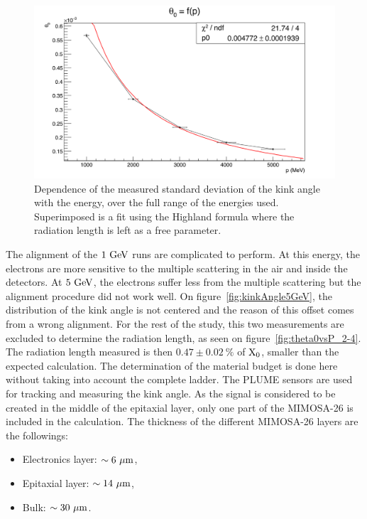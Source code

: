    \begin{figure}[!h]
     \centering
     \includegraphics[width = \textwidth]{Pictures/X0/theta0VsP_all.png}
     \caption{Dependence of the measured standard deviation of the kink angle with the energy, over the full range of the energies used. Superimposed is a fit using the Highland formula where the radiation length is left as a free parameter.}
     \label{fig:theta0vsP_all}
   \end{figure}

   The alignment of the $1~\rm{GeV}$ runs are complicated to perform.
   At this energy, the electrons are more sensitive to the multiple scattering in the air and inside the detectors.
   At $5~\rm{GeV}$, the electrons suffer less from the multiple scattering but the alignment procedure did not work well. 
   On figure~\ref{fig:kinkAngle5GeV}, the distribution of the kink angle is not centered and the reason of this offset comes from a wrong alignment.
   For the rest of the study, this two measurements are excluded to determine the radiation length, as seen on figure~\ref{fig:theta0vsP_2-4}.
   The radiation length measured is then $0.47 \pm 0.02~\%$ of $\rm{X_0}$, smaller than the expected calculation.
   The determination of the material budget is done here without taking into account the complete ladder.
   The \gls{PLUME} sensors are used for tracking and measuring the kink angle.
   As the signal is considered to be created in the middle of the epitaxial layer, only one part of the \gls{MIMOSA}-26 is included in the calculation.
   The thickness of the different \gls{MIMOSA}-26 layers are the followings:
   
   \begin{itemize}
     \item Electronics layer: $\sim 6~\rm{\mu m}$,
     \item Epitaxial layer: $\sim 14~\rm{\mu m}$,
     \item Bulk: $\sim 30~\rm{\mu m}$.
   \end{itemize}

